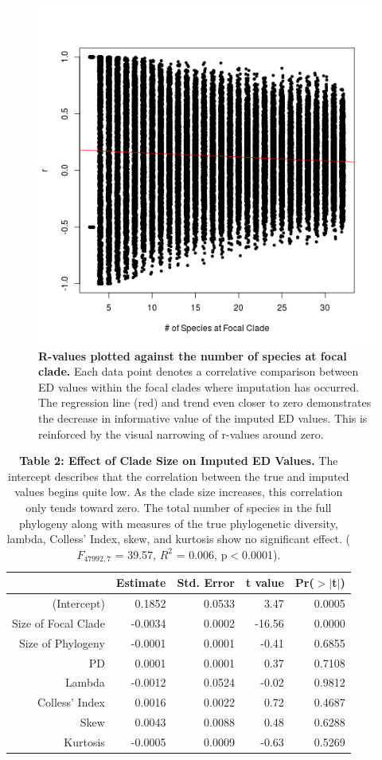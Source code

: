 \documentclass[12pt,english]{article}
\begin{document}
\begin{figure}[!ht]
  \center
  \includegraphics[width=.5\textwidth]{edModel.png}
  \caption{\textbf{R-values plotted against the number of species at focal
  clade.} Each data point denotes a correlative comparison between ED values
  within the focal clades where imputation has occurred. The regression line
  (red) and trend even closer to zero demonstrates the decrease in informative
  value of the imputed ED values. This is reinforced by the visual narrowing of
  r-values around zero.}
  \label{imputationTrend}
\end{figure}

\begin{table}[ht] 
\centering
\begin{tabular}{rrrrr}
  \hline
  & Estimate & Std. Error & t value & Pr($>$$|$t$|$) \\
   \hline
 (Intercept) & 0.1852 & 0.0533 & 3.47 & 0.0005 \\
   Size of Focal Clade & -0.0034 & 0.0002 & -16.56 & 0.0000 \\
   Size of Phylogeny & -0.0001 & 0.0001 & -0.41 & 0.6855 \\
   PD & 0.0001 & 0.0001 & 0.37 & 0.7108 \\
   Lambda & -0.0012 & 0.0524 & -0.02 & 0.9812 \\
   Colless' Index & 0.0016 & 0.0022 & 0.72 & 0.4687 \\
   Skew & 0.0043 & 0.0088 & 0.48 & 0.6288 \\
   Kurtosis & -0.0005 & 0.0009 & -0.63 & 0.5269 \\
   \hline
   \hline
\end{tabular}
\caption*{\textbf{Table 2: Effect of Clade Size on Imputed ED Values.} The
intercept describes that the correlation between the true and imputed values
begins quite low. As the clade size increases, this correlation only tends
toward zero. The total number of species in the full phylogeny along with
measures of the true phylogenetic diversity, lambda, Colless' Index, skew, and
kurtosis show no significant effect. ($F_{47992, 7}$ = 39.57, $R^{2}$ = 0.006,
p$<$0.0001).}
\end{table}
\end{document}
